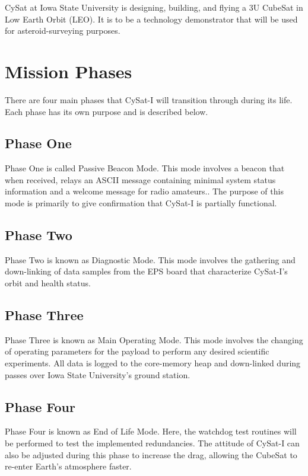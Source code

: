 \documentclass[12pt]{article}
\begin{document}
CySat at Iowa State University is designing, building, and flying a 3U CubeSat in Low Earth Orbit (LEO). It is to be a technology demonstrator that will be used for asteroid-surveying purposes.

\section{Mission Phases}

There are four main phases that CySat-I will transition through during its life. Each phase has its own purpose and is described below.

\subsection{Phase One}

Phase One is called Passive Beacon Mode. This mode involves a beacon that when received, relays an ASCII message containing minimal system status information and a welcome message for radio amateurs.. The purpose of this mode is primarily to give confirmation that CySat-I is partially functional.

\subsection{Phase Two}

Phase Two is known as Diagnostic Mode. This mode involves the gathering and down-linking of data samples from the EPS board that characterize CySat-I's orbit and health status.

\subsection{Phase Three}

Phase Three is known as Main Operating Mode. This mode involves the changing of operating parameters for the payload to perform any desired scientific experiments. All data is logged to the core-memory heap and down-linked during passes over Iowa State University's ground station.

\subsection{Phase Four}

Phase Four is known as End of Life Mode. Here, the watchdog test routines will be performed to test the implemented redundancies. The attitude of CySat-I can also be adjusted during this phase to increase the drag, allowing the CubeSat to re-enter Earth's atmosphere faster.
\end{document}
